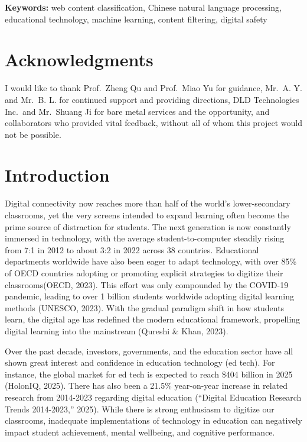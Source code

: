 \documentclass[
  titlepage]{article}
\begin{document}
\textbf{Keywords:} web content classification, Chinese natural language
processing, educational technology, machine learning, content filtering,
digital safety

\newpage

\section*{Acknowledgments}\label{acknowledgments}

I would like to thank Prof.~Zheng Qu and Prof.~Miao Yu for guidance,
Mr.~A. Y. and Mr.~B. L. for continued support and providing directions,
DLD Technologies Inc.~and Mr.~Shuang Ji for bare metal services and the
opportunity, and collaborators who provided vital feedback, without all
of whom this project would not be possible.

\section{Introduction}\label{introduction}

Digital connectivity now reaches more than half of the world's
lower-secondary classrooms, yet the very screens intended to expand
learning often become the prime source of distraction for students. The
next generation is now constantly immersed in technology, with the
average student-to-computer steadily rising from 7:1 in 2012 to about
3:2 in 2022 across 38 countries. Educational departments worldwide have
also been eager to adapt technology, with over 85\% of OECD countries
adopting or promoting explicit strategies to digitize their
classrooms(OECD, 2023). This effort was only compounded by the COVID-19
pandemic, leading to over 1 billion students worldwide adopting digital
learning methods (UNESCO, 2023). With the gradual paradigm shift in how
students learn, the digital age has redefined the modern educational
framework, propelling digital learning into the mainstream (Qureshi \&
Khan, 2023).

Over the past decade, investors, governments, and the education sector
have all shown great interest and confidence in education technology (ed
tech). For instance, the global market for ed tech is expected to reach
\$404 billion in 2025 (HolonIQ, 2025). There has also been a 21.5\%
year-on-year increase in related research from 2014-2023 regarding
digital education ({``Digital Education Research Trends 2014-2023,''}
2025). While there is strong enthusiasm to digitize our classrooms,
inadequate implementations of technology in education can negatively
impact student achievement, mental wellbeing, and cognitive performance.
\end{document}
